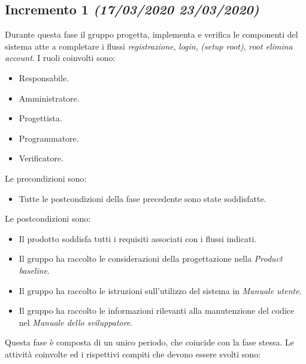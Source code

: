 \documentclass[../piano-di-progetto.tex]{subfiles}
\begin{document}
\subsection[Incremento 1]{Incremento 1 {\normalsize\normalfont\itshape(17/03/2020  23/03/2020)}}%
\label{sub:incremento_1}
Durante questa fase il gruppo progetta, implementa e verifica le componenti del sistema atte a completare i flussi \textit{registrazione}, \textit{login}, \textit{(setup root)}, \textit{root elimina account}.
I ruoli coinvolti sono:
\begin{itemize}
  \item Responsabile.
  \item Amministratore.
  \item Progettista.
  \item Programmatore.
  \item Verificatore.
\end{itemize}
Le precondizioni sono:
\begin{itemize}
  \item Tutte le postcondizioni della fase precedente sono state soddisfatte.
\end{itemize}
Le postcondizioni sono:
\begin{itemize}
  \item Il prodotto soddisfa tutti i requisiti associati con i flussi indicati.
  \item Il gruppo ha raccolto le considerazioni della progettazione nella \textit{Product baseline}.
  \item Il gruppo ha raccolto le istruzioni sull'utilizzo del sistema in \textit{Manuale utente}.
  \item Il gruppo ha raccolto le informazioni rilevanti alla manutenzione del codice nel \textit{Manuale dello sviluppatore}.
\end{itemize}
Questa fase è composta di un unico periodo, che coincide con la fase stessa.
Le attività coinvolte ed i rispettivi compiti che devono essere svolti sono:
\end{document}
